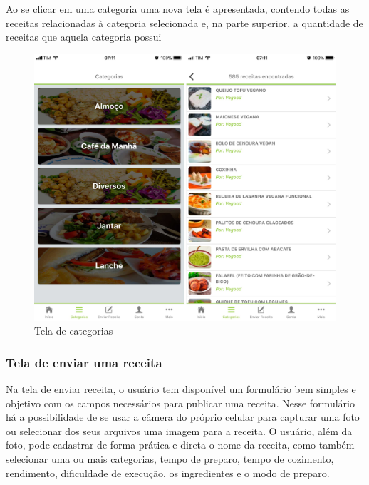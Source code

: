 Ao se clicar em uma categoria uma nova tela é apresentada, contendo todas as receitas relacionadas à categoria selecionada e, na parte superior, a quantidade de receitas que aquela categoria possui

\begin{figure}[H]
	\caption{\label{fig:tela-de-4}Tela de categorias}
	\centering
	\includegraphics[scale=0.15]{imagens/figura15.jpg}
\end{figure}

\subsubsection{Tela de enviar uma receita}
Na tela de enviar receita, o usuário tem disponível um formulário bem simples e objetivo com os campos necessários para publicar uma receita. Nesse formulário  há a possibilidade de se usar a câmera do próprio celular para capturar uma foto ou selecionar dos seus arquivos uma imagem para a receita. O usuário, além da foto, pode cadastrar de forma prática e direta o nome da receita, como também selecionar uma ou mais categorias, tempo de preparo, tempo de cozimento, rendimento, dificuldade de execução, os ingredientes e o modo de preparo.

